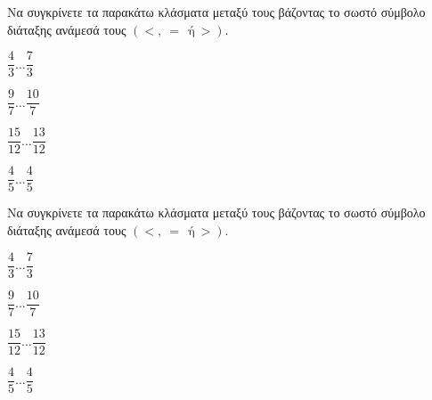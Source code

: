 Να συγκρίνετε τα παρακάτω κλάσματα μεταξύ τους βάζοντας το σωστό σύμβολο διάταξης ανάμεσά τους $ (<,\ =\ \ \textrm{ή}\ >) $.
\begin{multicols}{3}
\begin{rlist}[leftmargin=3mm]
\item $ \dfrac{4}{3}\ldots \dfrac{7}{3} $
\item $ \dfrac{9}{7}\ldots \dfrac{10}{7} $
\item $ \dfrac{15}{12}\ldots \dfrac{13}{12} $
\item $ \dfrac{4}{5}\ldots \dfrac{4}{5} $
\end{rlist}
\end{multicols}
Να συγκρίνετε τα παρακάτω κλάσματα μεταξύ τους βάζοντας το σωστό σύμβολο διάταξης ανάμεσά τους $ (<,\ =\ \ \textrm{ή}\ >) $.
\begin{multicols}{3}
\begin{rlist}[leftmargin=3mm]
\item $ \dfrac{4}{3}\ldots \dfrac{7}{3} $
\item $ \dfrac{9}{7}\ldots \dfrac{10}{7} $
\item $ \dfrac{15}{12}\ldots \dfrac{13}{12} $
\item $ \dfrac{4}{5}\ldots \dfrac{4}{5} $
\end{rlist}
\end{multicols}
